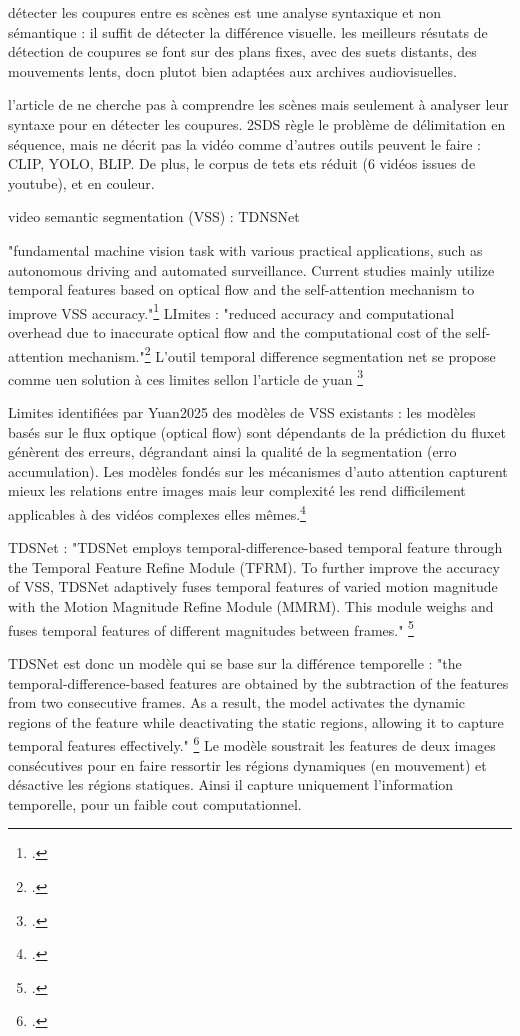 \begin{itemize}
détecter les coupures entre es scènes est une analyse syntaxique et non sémantique : il suffit de détecter la différence visuelle. les meilleurs résutats de détection de coupures se font sur des plans fixes, avec des suets distants, des mouvements lents, docn plutot bien adaptées aux archives audiovisuelles. 

l'article de \cite{xin2023} ne cherche pas à comprendre les scènes mais seulement à analyser leur syntaxe pour en détecter les coupures. 2SDS règle le problème de délimitation en séquence, mais ne décrit pas la vidéo comme d'autres outils peuvent le faire : CLIP, YOLO, BLIP. De plus, le corpus de tets ets réduit (6 vidéos issues de youtube), et en couleur. 


\subitem video semantic segmentation (VSS) : TDNSNet

"fundamental machine vision task with various practical applications, such as autonomous driving and automated surveillance. Current studies mainly utilize temporal features based on optical flow and the self-attention mechanism to improve VSS accuracy."\footcite{yuan2025}
LImites : "reduced accuracy and computational overhead due to inaccurate optical flow and the computational cost of the self-attention mechanism."\footcite{yuan2025}
L'outil temporal difference segmentation net se propose comme uen solution à ces limites sellon l'article de yuan \footcite{yuan2025}

Limites identifiées par Yuan2025 des modèles de VSS existants : les modèles basés sur le flux optique (optical flow) sont dépendants de la prédiction du fluxet génèrent des erreurs, dégrandant ainsi la qualité de la segmentation (erro accumulation). Les modèles fondés sur les mécanismes d'auto attention capturent mieux les relations entre images mais leur complexité les rend difficilement applicables à des vidéos complexes elles mêmes.\footcite{yuan2025}

TDSNet : "TDSNet employs temporal-difference-based temporal feature through the Temporal Feature Refine Module (TFRM). To further improve the accuracy of VSS, TDSNet adaptively fuses temporal features of varied motion magnitude with the Motion Magnitude Refine Module (MMRM). This module weighs and fuses temporal features of different magnitudes between frames." \footcite{yuan2025}

TDSNet est donc un modèle qui se base sur la différence temporelle : 
"the temporal-difference-based features are obtained by the subtraction of the features from two consecutive frames. As a result, the model activates the dynamic regions of the feature while deactivating the static regions, allowing it to capture temporal features effectively." \footcite{yuan2025} Le modèle soustrait les features de deux images consécutives pour en faire ressortir les régions dynamiques (en mouvement) et désactive les régions statiques. Ainsi il capture uniquement l'information temporelle, pour un faible cout computationnel. 


\end{itemize}
